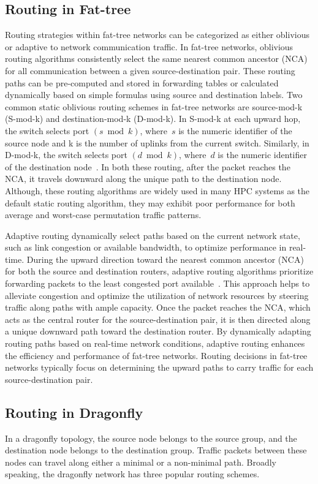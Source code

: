 \subsection{Routing in Fat-tree}
Routing strategies within fat-tree networks can be categorized as either oblivious or adaptive to network communication traffic. In fat-tree networks, oblivious routing algorithms consistently select the same nearest common ancestor (NCA) for all communication between a given source-destination pair. These routing paths can be pre-computed and stored in forwarding tables or calculated dynamically based on simple formulas using source and destination labels. Two common static oblivious routing schemes in fat-tree networks are source-mod-k (S-mod-k) and destination-mod-k (D-mod-k). In S-mod-k at each upward hop, the switch selects port
$(s \bmod k)$, where~$s$ is the numeric identifier of the source node and k is the number of uplinks from the current switch. Similarly, in D-mod-k, the switch selects port
$(d \bmod k)$, where~$d$ is the numeric identifier of the destination node~\cite{rodriguez2009oblivious, mahapatra2012limited}. In both these routing, after the packet reaches the NCA, it travels downward along the unique path to the destination node. Although, these routing algorithms are widely used in many HPC systems as the default static routing algorithm, they may exhibit poor performance for both average and worst-case permutation traffic patterns. 

Adaptive routing dynamically select paths based on the current network state, such as link congestion or available bandwidth, to optimize performance in real-time. During the upward direction toward the nearest common ancestor (NCA) for both the source and destination routers, adaptive routing algorithms prioritize forwarding packets to the least congested port available~\cite{gomez2007deterministic}. This approach helps to alleviate congestion and optimize the utilization of network resources by steering traffic along paths with ample capacity. Once the packet reaches the NCA, which acts as the central router for the source-destination pair, it is then directed along a unique downward path toward the destination router. By dynamically adapting routing paths based on real-time network conditions, adaptive routing enhances the efficiency and performance of fat-tree networks. Routing decisions in fat-tree networks typically focus on determining the upward paths to carry traffic for each source-destination pair.

\subsection{Routing in Dragonfly}
In a dragonfly topology, the source node belongs to the source group, and the destination node belongs to the destination group. Traffic packets between these nodes can travel along either a minimal or a non-minimal path. Broadly speaking, the dragonfly network has three popular routing schemes.

